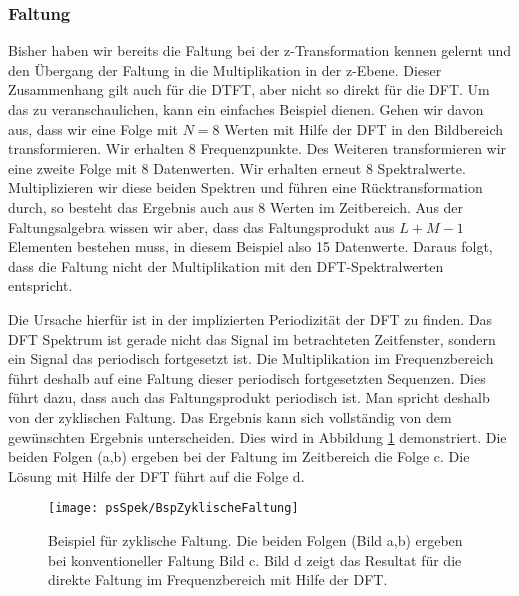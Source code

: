 \subsubsection{Faltung \label{sec:DFT:Faltung}}
Bisher haben wir bereits die Faltung bei der z-Transformation kennen gelernt und
den Übergang der Faltung in die Multiplikation in der z-Ebene. Dieser Zusammenhang
gilt auch für die DTFT, aber nicht so direkt für die DFT. Um das zu veranschaulichen,
kann ein einfaches Beispiel dienen. Gehen wir davon aus, dass wir eine Folge mit $N = 8$
Werten mit Hilfe der DFT in den Bildbereich transformieren. Wir erhalten 8 Frequenzpunkte.
Des Weiteren transformieren wir eine zweite Folge mit 8 Datenwerten. Wir erhalten
erneut 8 Spektralwerte. Multiplizieren wir diese beiden Spektren und führen eine
Rücktransformation durch, so besteht das Ergebnis auch aus 8 Werten im Zeitbereich.
Aus der Faltungsalgebra wissen wir aber, dass das Faltungsprodukt aus $L+M-1$
Elementen bestehen muss, in diesem Beispiel also 15 Datenwerte. Daraus folgt, dass die
Faltung nicht der Multiplikation mit den DFT-Spektralwerten entspricht.

Die Ursache hierfür ist in der implizierten Periodizität der DFT zu finden. Das DFT Spektrum
ist gerade nicht das Signal im betrachteten Zeitfenster, sondern ein Signal das periodisch
fortgesetzt ist. Die Multiplikation im Frequenzbereich führt deshalb auf eine Faltung dieser
periodisch fortgesetzten Sequenzen. Dies führt dazu, dass auch das Faltungsprodukt periodisch ist.
Man spricht deshalb von der zyklischen Faltung. Das Ergebnis kann sich vollständig von dem
gewünschten Ergebnis unterscheiden. Dies wird in Abbildung \ref{pic:BspZyklischeFaltung} demonstriert.
Die beiden Folgen (a,b) ergeben bei der Faltung im Zeitbereich die Folge c. Die Lösung mit Hilfe der
DFT führt auf die Folge d.

\begin{figure}[H]
\begin{center}
\texttt{[image: psSpek/BspZyklischeFaltung]}
\caption{\label{pic:BspZyklischeFaltung}Beispiel für zyklische Faltung. Die beiden Folgen (Bild a,b)
ergeben bei konventioneller Faltung Bild c. Bild d zeigt das Resultat für die direkte Faltung im
Frequenzbereich mit Hilfe der DFT.}
\end{center}
\end{figure}


